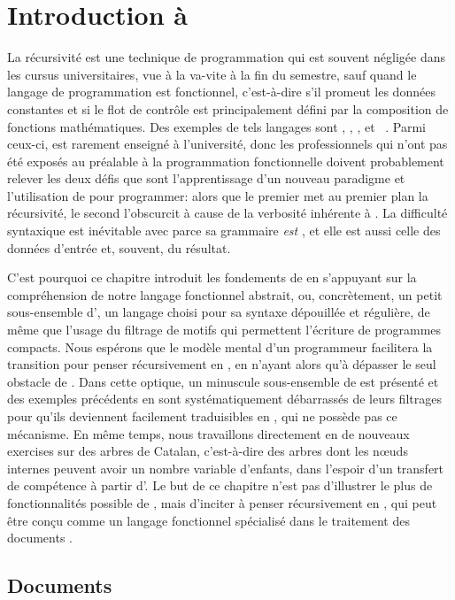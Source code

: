 \chapter{Introduction à \XSLT}

La récursivité est une technique de programmation qui est souvent
négligée dans les cursus universitaires, vue à la va-vite à la fin du
semestre, sauf quand le langage de programmation est fonctionnel,
c'est-à-dire s'il promeut les données constantes et si le flot de
contrôle est principalement défini par la composition de fonctions
mathématiques. Des exemples de tels langages sont \Scheme, \Haskell,
\OCaml, \Erlang et \XSLT~\citep{Kay_2008}. Parmi ceux-ci, \XSLT est
rarement enseigné à l'université, donc les professionnels qui n'ont
pas été exposés au préalable à la programmation fonctionnelle doivent
probablement relever les deux défis que sont l'apprentissage d'un
nouveau paradigme et l'utilisation de \XML pour programmer: alors que
le premier met au premier plan la récursivité, le second l'obscurcit à
cause de la verbosité inhérente à \XML. La difficulté syntaxique est
inévitable avec \XSLT parce sa grammaire \emph{est} \XML, et elle est
aussi celle des données d'entrée et, souvent, du résultat.

C'est pourquoi ce chapitre introduit les fondements de \XSLT en
s'appuyant sur la compréhension de notre langage fonctionnel abstrait,
ou, concrètement, un petit sous-ensemble d'\Erlang, un langage choisi
pour sa syntaxe dépouillée et régulière, de même que l'usage du
filtrage de motifs qui permettent l'écriture de programmes
compacts. Nous espérons que le modèle mental d'un programmeur \Erlang
facilitera la transition pour penser récursivement en \XSLT, en
n'ayant alors qu'à dépasser le seul obstacle de \XML. Dans cette
optique, un minuscule sous-ensemble de \XSLT est présenté et des
exemples précédents en \Erlang sont systématiquement débarrassés de
leurs filtrages pour qu'ils deviennent facilement traduisibles en
\XSLT, qui ne possède pas ce mécanisme. En même temps, nous
travaillons directement en \XSLT de nouveaux exercises sur des arbres
de Catalan, c'est-à-dire des arbres dont les n{\oe}uds internes
peuvent avoir un nombre variable d'enfants, dans l'espoir d'un
transfert de compétence à partir d'\Erlang. Le but de ce chapitre
n'est pas d'illustrer le plus de fonctionnalités possible de \XSLT,
mais d'inciter à penser récursivement en \XSLT, qui peut être conçu
comme un langage fonctionnel spécialisé dans le traitement des
documents \XML.


\section{Documents}

